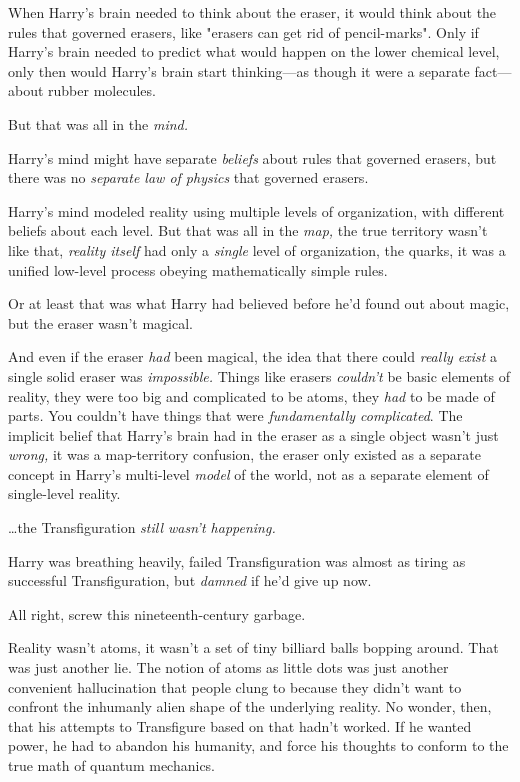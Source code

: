When Harry's brain needed to think about the eraser, it would think about the 
rules that governed erasers, like "erasers can get rid of pencil-marks". Only 
if Harry's brain needed to predict what would happen on the lower chemical 
level, only then would Harry's brain start thinking---as though it were a 
separate fact---about rubber molecules.

But that was all in the \emph{mind.}

Harry's mind might have separate \emph{beliefs} about rules that governed 
erasers, but there was no \emph{separate law of physics} that governed erasers.

Harry's mind modeled reality using multiple levels of organization, with 
different beliefs about each level. But that was all in the \emph{map,} the 
true territory wasn't like that, \emph{reality itself} had only a \emph{single} 
level of organization, the quarks, it was a unified low-level process obeying 
mathematically simple rules.

Or at least that was what Harry had believed before he'd found out about magic, 
but the eraser wasn't magical.

And even if the eraser \emph{had} been magical, the idea that there could 
\emph{really exist} a single solid eraser was \emph{impossible.} Things like 
erasers \emph{couldn't} be basic elements of reality, they were too big and 
complicated to be atoms, they \emph{had} to be made of parts\emph{.} You 
couldn't have things that were \emph{fundamentally complicated}. The implicit 
belief that Harry's brain had in the eraser as a single object wasn't just 
\emph{wrong,} it was a map-territory confusion, the eraser only existed as a 
separate concept in Harry's multi-level \emph{model} of the world, not as a 
separate element of single-level reality.

{\ldots}the Transfiguration \emph{still wasn't happening.}

Harry was breathing heavily, failed Transfiguration was almost as tiring as 
successful Transfiguration, but \emph{damned} if he'd give up now.

All right, screw this nineteenth-century garbage.

Reality wasn't atoms, it wasn't a set of tiny billiard balls bopping around. 
That was just another lie. The notion of atoms as little dots was just another 
convenient hallucination that people clung to because they didn't want to 
confront the inhumanly alien shape of the underlying reality. No wonder, then, 
that his attempts to Transfigure based on that hadn't worked. If he wanted 
power, he had to abandon his humanity, and force his thoughts to conform to the 
true math of quantum mechanics.

